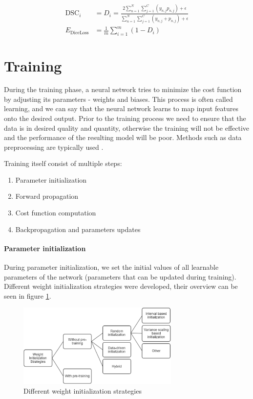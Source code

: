 \begin{align}
\label{eq:dsc}
\text{DSC}_i &= D_i = \frac{2 \sum_{n=1}^N \sum_{j=1}^C (y_{n,j} p_{n,j}) + \epsilon}{\sum_{n=1}^N\sum_{j=1}^C (y_{n,j} + p_{n,j}) + \epsilon} \\
\label{eq:diceloss}
E_\text{DiceLoss} &= \frac{1}{m}\sum_{i=1}^m (1-D_i)
\end{align}

\section{Training}
During the training phase, a neural network tries to minimize the cost function by adjusting its parameters - weights and biases. This process is often called learning, and we can say that the neural network learns to map input features onto the desired output. Prior to the training process we need to ensure that the data is in desired quality and quantity, otherwise the training will not be effective and the performance of the resulting model will be poor. Methods such as data preprocessing are typically used \cite{Goodfellow2016, LeCun2015}. 

Training itself consist of multiple steps:

\begin{enumerate}
    \item Parameter initialization
    \item Forward propagation
    \item Cost function computation
    \item Backpropagation and parameters updates
\end{enumerate}

\paragraph{Parameter initialization} During parameter initialization, we set the initial values of all learnable parameters of the network (parameters that can be updated during training). Different weight initialization strategies were developed, their overview can be seen in figure \ref{fig:init}.

\begin{figure}[H]
\begin{centering}
\includegraphics[width=8cm]{assets/images/init.png}
\par\end{centering}
\caption{Different weight initialization strategies \cite{Narkhede2021}}
\label{fig:init}
\end{figure}

